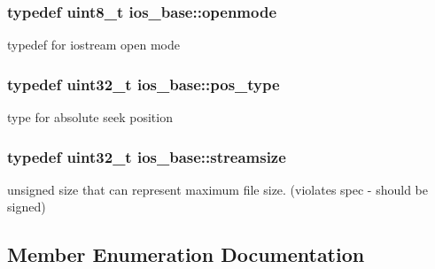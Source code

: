 \subsubsection[{\texorpdfstring{openmode}{openmode}}]{\setlength{\rightskip}{0pt plus 5cm}typedef uint8\+\_\+t {\bf ios\+\_\+base\+::openmode}}\hypertarget{classios__base_aaa192ec0dccc43050715553a34644523}{}\label{classios__base_aaa192ec0dccc43050715553a34644523}
typedef for iostream open mode 
\subsubsection[{\texorpdfstring{pos\+\_\+type}{pos_type}}]{\setlength{\rightskip}{0pt plus 5cm}typedef uint32\+\_\+t {\bf ios\+\_\+base\+::pos\+\_\+type}}\hypertarget{classios__base_abe85cf1f181b8bce8022f05ab76aae7f}{}\label{classios__base_abe85cf1f181b8bce8022f05ab76aae7f}
type for absolute seek position 
\subsubsection[{\texorpdfstring{streamsize}{streamsize}}]{\setlength{\rightskip}{0pt plus 5cm}typedef uint32\+\_\+t {\bf ios\+\_\+base\+::streamsize}}\hypertarget{classios__base_a82836e1d3cc603fba8f0b54d323a2dff}{}\label{classios__base_a82836e1d3cc603fba8f0b54d323a2dff}
unsigned size that can represent maximum file size. (violates spec -\/ should be signed) 

\subsection{Member Enumeration Documentation}
